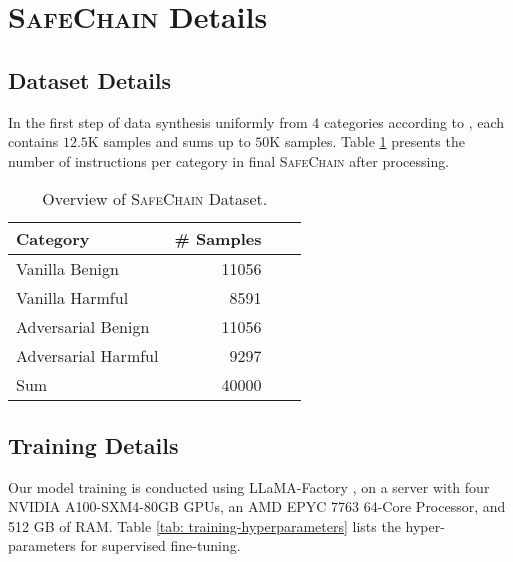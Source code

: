 
\section{\textsc{SafeChain} Details}

\subsection{Dataset Details}
\label{appx:dataset-detail}

In the first step of data synthesis uniformly from $4$ categories  according to \citet{jiang2024wildteaming}, each contains $12.5$K samples and sums up to $50$K samples. 
Table \ref{tab:safechain-databreakup} presents the number of instructions per category in final \textsc{SafeChain} after processing.


\begin{table}[h]
    \centering
    \begin{tabular}{l r c c }\toprule
       Category  & \# Samples \\ \midrule
        Vanilla Benign &  11056\\
        Vanilla Harmful & 8591 \\
        Adversarial Benign & 11056\\
        Adversarial Harmful & 9297\\ \midrule
        Sum & 40000 \\ \bottomrule
    \end{tabular}
    \caption{Overview of \textsc{SafeChain} Dataset.}
    \label{tab:safechain-databreakup}
\end{table}



\subsection{Training Details}
\label{appx:training-setup}
Our model training is conducted using LLaMA-Factory \citep{zheng2024llamafactory}, on a server with four NVIDIA A100-SXM4-80GB GPUs, an AMD EPYC 7763 64-Core Processor, and 512 GB of RAM. Table \ref{tab: training-hyperparameters} lists the hyper-parameters for supervised fine-tuning. 


